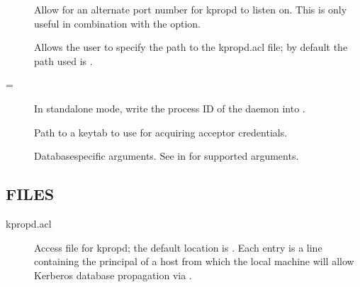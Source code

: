\documentclass[letterpaper,10pt,english]{sphinxmanual}
\begin{document}
\begin{description}
\item[{}] \leavevmode
\sphinxAtStartPar
Allow for an alternate port number for kpropd to listen on.  This
is only useful in combination with the  option.

\item[{ }] \leavevmode
\sphinxAtStartPar
Allows the user to specify the path to the kpropd.acl file; by
default the path used is {\hyperref[\detokenize{mitK5defaults:paths}]{}}.

\item[{=}] \leavevmode
\sphinxAtStartPar
In standalone mode, write the process ID of the daemon into
.

\item[{ }] \leavevmode
\sphinxAtStartPar
Path to a keytab to use for acquiring acceptor credentials.

\item[{ }] \leavevmode
\sphinxAtStartPar
Database\sphinxhyphen{}specific arguments.  See {\hyperref[\detokenize{admin/admin_commands/kadmin_local:dboptions}]{}} in {\hyperref[\detokenize{admin/admin_commands/kadmin_local:kadmin-1}]{}} for supported arguments.

\end{description}


\subsection{FILES}
\label{\detokenize{admin/admin_commands/kpropd:files}}\begin{description}
\item[{kpropd.acl}] \leavevmode
\sphinxAtStartPar
Access file for kpropd; the default location is
.  Each entry is a line
containing the principal of a host from which the local machine
will allow Kerberos database propagation via {\hyperref[\detokenize{admin/admin_commands/kprop:kprop-8}]{}}.

\end{description}
\end{document}
